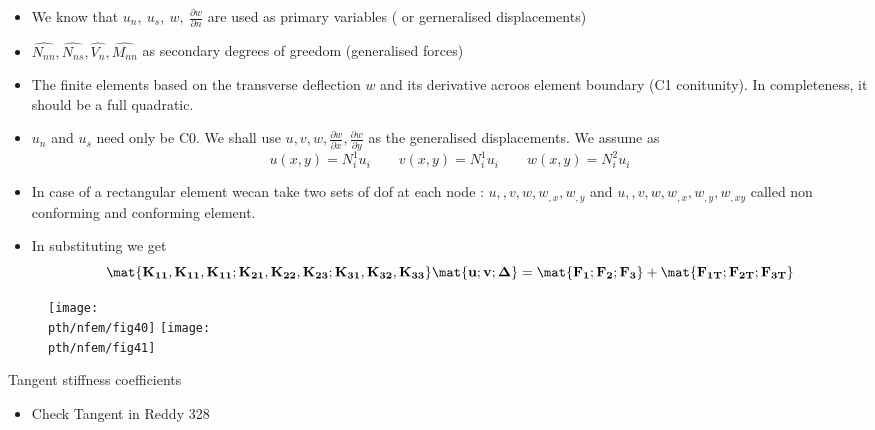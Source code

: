 	\begin{frame}
		\begin{itemize}
			\item We know that $u_n,~u_s,~w,~\frac{\partial w}{\partial n}$ are used as primary variables ( or gerneralised displacements)
			\item $\hat{N_{nn}},\hat{N_{ns}},\hat{V_{n}},\hat{M_{nn}}$ as secondary degrees of greedom (generalised forces)
			\item The finite elements based on the transverse deflection $w$ and its derivative acroos element boundary (C1 conitunity). In completeness, it should be a full quadratic.
			\item $u_n$ and $u_s$ need only be C0. We shall use $u,v,w,\frac{\partial w}{\partial x}, \frac{\partial w}{\partial y}$ as the generalised displacements. We assume as
			\begin{equation}
			u(x,y) =N_i^1u_i \qquad v(x,y)=N_i^1u_i \qquad w(x,y) = N_i^2u_i
			\end{equation}
			\item In case of a rectangular element wecan take two sets of dof at each node : $u,,v,w,w_{,x},w_{,y}$ and $u,,v,w,w_{,x},w_{,y}, w_{,xy}$ called non conforming and conforming element. 
			\item  In substituting we get
			\begin{equation}
				\ve{\mat{K_{11},K_{11},K_{11};K_{21},K_{22},K_{23};K_{31},K_{32},K_{33}} \mat{u;v;\Delta} = \mat{F_1;F_2;F_3} + \mat{F_{1T};F_{ 2T};F_{3T}} }
			\end{equation}
			
		\end{itemize}
	\end{frame}


	\begin{frame}
		\begin{figure}
			\centering
			\texttt{[image: \\pth/nfem/fig40]}  		
			\texttt{[image: \\pth/nfem/fig41]}
		\end{figure}
	\end{frame}


	\begin{frame}{Tangent stiffness coefficients}
		\begin{itemize}
			\item Check Tangent in Reddy 328
		\end{itemize}
	\end{frame}


